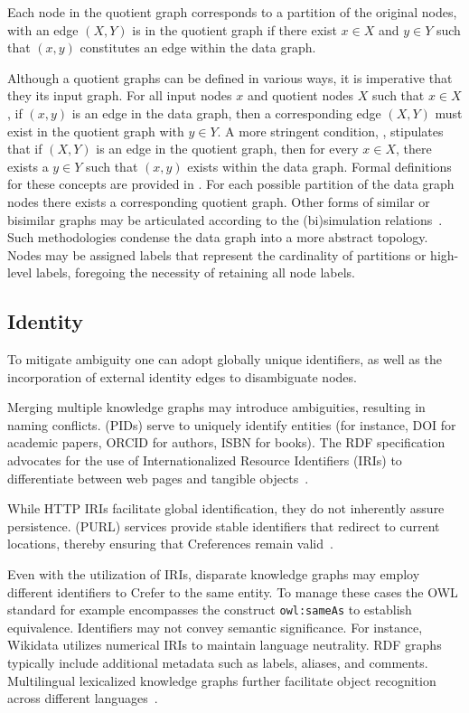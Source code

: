 Each node in the quotient graph corresponds to a partition of the original nodes, with an edge $(X,Y)$ is in the quotient graph if there exist $x\in X$ and $y\in Y$ such that $(x,y)$ constitutes an edge within the data graph.

Although a quotient graphs can be defined in various ways, it is imperative that they  its input graph. For all input nodes $x$ and quotient nodes $X$ such that $x\in X$, if $(x,y)$ is an edge in the data graph, then a corresponding edge $(X,Y)$ must exist in the quotient graph with $y\in Y$. A more stringent condition, , stipulates that if $(X,Y)$ is an edge in the quotient graph, then for every $x\in X$, there exists a $y\in Y$ such that $(x,y)$ exists within the data graph. Formal definitions for these concepts are provided in .
For each possible partition of the data graph nodes there exists a  corresponding quotient graph. Other forms of similar or bisimilar graphs may be articulated according to the (bi)simulation relations~\cite{Cebiric2019SummarizingSemanticGraphs}. Such methodologies condense the data graph into a more abstract topology. Nodes may be assigned labels that represent the cardinality of partitions or high-level labels, foregoing the necessity of retaining all node labels.

\subsection{Identity}\label{identity}
To mitigate ambiguity one can adopt globally unique identifiers, as well as the incorporation of external identity edges to disambiguate nodes.

Merging multiple knowledge graphs may introduce ambiguities, resulting in naming conflicts.  (PIDs) serve to uniquely identify entities (for instance, DOI for academic papers, ORCID for authors, ISBN for books). The RDF specification advocates for the use of Internationalized Resource Identifiers (IRIs) to differentiate between web pages and tangible objects~\cite{Hakala2010PIDs}.

While HTTP IRIs facilitate global identification, they do not inherently assure persistence.  (PURL) services provide stable identifiers that redirect to current locations, thereby ensuring that Creferences remain valid~\cite{BernersLee2006LinkedData}\cite{Heath2011LinkedData}.

Even with the utilization of IRIs, disparate knowledge graphs may employ different identifiers to Crefer to the same entity. To manage these cases the OWL standard for example encompasses the construct \texttt{owl:sameAs} to establish equivalence.
Identifiers may not convey semantic significance. For instance, Wikidata utilizes numerical IRIs to maintain language neutrality. RDF graphs typically include additional metadata such as labels, aliases, and comments. Multilingual lexicalized knowledge graphs further facilitate object recognition across different languages~\cite{DeMelo2015Lexvo.org, MartinezRodriguez2020InformationExtractionMeetsSemanticWeb}.  

